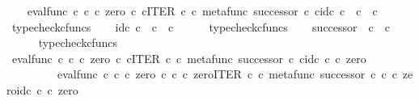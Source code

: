 \begin{isabellebody}
\ \ \isamarkupfalse%
\ {\isachardoublequoteopen}eval{\isacharunderscore}{\kern0pt}func\ {\isasymnat}\isactrlsub c\ {\isasymnat}\isactrlsub c\ {\isasymcirc}\isactrlsub c\ {\isasymlangle}zero\ {\isasymcirc}\isactrlsub c\ {\isasymbeta}\isactrlbsub {\isasymnat}\isactrlsub c\isactrlesub {\isacharcomma}{\kern0pt}ITER\ {\isasymnat}\isactrlsub c\ {\isasymcirc}\isactrlsub c\ {\isasymlangle}metafunc\ successor\ {\isasymcirc}\isactrlsub c\ {\isasymbeta}\isactrlbsub {\isasymnat}\isactrlsub c\isactrlesub {\isacharcomma}{\kern0pt}id\isactrlsub c\ {\isasymnat}\isactrlsub c{\isasymrangle}{\isasymrangle}\ {\isacharcolon}{\kern0pt}\ {\isasymnat}\isactrlsub c\ {\isasymrightarrow}\ {\isasymnat}\isactrlsub c{\isachardoublequoteclose}\isanewline
\ \ \ \ \isamarkupfalse%
\ typecheck{\isacharunderscore}{\kern0pt}cfuncs\isanewline
\ \ \isamarkupfalse%
\ {\isachardoublequoteopen}id\isactrlsub c\ {\isasymnat}\isactrlsub c\ {\isacharcolon}{\kern0pt}\ {\isasymnat}\isactrlsub c\ {\isasymrightarrow}\ {\isasymnat}\isactrlsub c{\isachardoublequoteclose}\isanewline
\ \ \ \ \isamarkupfalse%
\ typecheck{\isacharunderscore}{\kern0pt}cfuncs\isanewline
\ \ \isamarkupfalse%
\ {\isachardoublequoteopen}successor\ {\isacharcolon}{\kern0pt}\ {\isasymnat}\isactrlsub c\ {\isasymrightarrow}\ {\isasymnat}\isactrlsub c{\isachardoublequoteclose}\isanewline
\ \ \ \ \isamarkupfalse%
\ typecheck{\isacharunderscore}{\kern0pt}cfuncs\isanewline
{}\isamarkupfalse%
\isanewline
\ \ \isamarkupfalse%
\ {\isachardoublequoteopen}{\isacharparenleft}{\kern0pt}eval{\isacharunderscore}{\kern0pt}func\ {\isasymnat}\isactrlsub c\ {\isasymnat}\isactrlsub c\ {\isasymcirc}\isactrlsub c\ {\isasymlangle}zero\ {\isasymcirc}\isactrlsub c\ {\isasymbeta}\isactrlbsub {\isasymnat}\isactrlsub c\isactrlesub {\isacharcomma}{\kern0pt}ITER\ {\isasymnat}\isactrlsub c\ {\isasymcirc}\isactrlsub c\ {\isasymlangle}metafunc\ successor\ {\isasymcirc}\isactrlsub c\ {\isasymbeta}\isactrlbsub {\isasymnat}\isactrlsub c\isactrlesub {\isacharcomma}{\kern0pt}id\isactrlsub c\ {\isasymnat}\isactrlsub c{\isasymrangle}{\isasymrangle}{\isacharparenright}{\kern0pt}\ {\isasymcirc}\isactrlsub c\ zero\ {\isacharequal}{\kern0pt}\isanewline
\ \ \ \ \ \ \ \ \ eval{\isacharunderscore}{\kern0pt}func\ {\isasymnat}\isactrlsub c\ {\isasymnat}\isactrlsub c\ {\isasymcirc}\isactrlsub c\ {\isasymlangle}zero\ {\isasymcirc}\isactrlsub c\ {\isasymbeta}\isactrlbsub {\isasymnat}\isactrlsub c\isactrlesub \ {\isasymcirc}\isactrlsub c\ zero{\isacharcomma}{\kern0pt}ITER\ {\isasymnat}\isactrlsub c\ {\isasymcirc}\isactrlsub c\ {\isasymlangle}metafunc\ successor\ {\isasymcirc}\isactrlsub c\ {\isasymbeta}\isactrlbsub {\isasymnat}\isactrlsub c\isactrlesub \ {\isasymcirc}\isactrlsub c\ zero{\isacharcomma}{\kern0pt}id\isactrlsub c\ {\isasymnat}\isactrlsub c\ {\isasymcirc}\isactrlsub c\ zero{\isasymrangle}{\isasymrangle}{\isachardoublequoteclose}\isanewline

\end{isabellebody}
